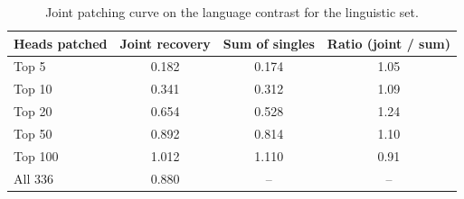 \begin{table}[t]
\centering
\small
\begin{tabular}{lccc}
\toprule
\textbf{Heads patched} & \textbf{Joint recovery} & \textbf{Sum of singles} & \textbf{Ratio (joint / sum)} \\
\midrule
Top 5 & 0.182 & 0.174 & 1.05 \\
Top 10 & 0.341 & 0.312 & 1.09 \\
Top 20 & 0.654 & 0.528 & 1.24 \\
Top 50 & 0.892 & 0.814 & 1.10 \\
Top 100 & 1.012 & 1.110 & 0.91 \\
All 336 & 0.880 & -- & -- \\
\bottomrule
\end{tabular}
\caption{Joint patching curve on the language contrast for the linguistic set.}
\label{tab:curve_ling}
\end{table}
